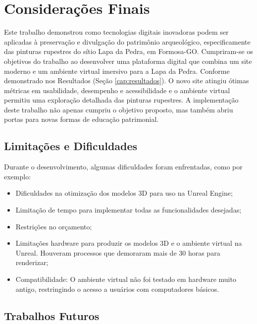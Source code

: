 \chapter{Considerações Finais} \label{cap:Considerações Finais}

Este trabalho demonstrou como tecnologias digitais inovadoras podem ser aplicadas à preservação e divulgação do patrimônio arqueológico, especificamente das pinturas rupestres do sítio Lapa da Pedra, em Formosa-GO. 
Cumpriram-se os objetivos do trabalho ao desenvolver uma plataforma digital que combina um site moderno e um ambiente virtual imersivo para a Lapa da Pedra. Conforme demonstrado nos Resultados (Seção \ref{cap:resultados}). O novo site atingiu ótimas métricas em usabilidade, desempenho e acessibilidade e o ambiente virtual permitiu uma exploração detalhada das pinturas rupestres.
A implementação deste trabalho não apenas cumpriu o objetivo proposto, mas também abriu portas para novas formas de educação patrimonial.

\section{Limitações e Dificuldades}
\label{sec:limitações}
Durante o desenvolvimento, algumas dificuldades foram enfrentadas, como por exemplo:
\begin{itemize}
    \item Dificuldades na otimização dos modelos 3D para uso na Unreal Engine;
    \item Limitação de tempo para implementar todas as funcionalidades desejadas;
    \item Restrições no orçamento;
    \item Limitações hardware para produzir os modelos 3D e o ambiente virtual na Unreal. Houveram processos que demoraram mais de 30 horas para renderizar;
    \item Compatibilidade: O ambiente virtual não foi testado em hardware muito antigo, restringindo o acesso a usuários com computadores básicos.
\end{itemize}

\section{Trabalhos Futuros} \label{sec:futuro}

